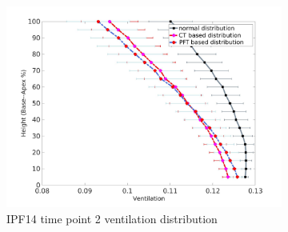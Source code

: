 \begin{figure}[htbp]  
\centering
\begin{subfigure}{.6\linewidth}%
  \includegraphics[width=\linewidth,trim={{.0\wd0} {.0\wd0} {.0\wd0} {.0\wd0}},clip]{Appendix/Image_AppexB/IPF1402/IPF1402_VentilationAgainstLungHeight.png} %
  \caption{IPF14 time point 2 ventilation distribution}
  \label{fig:VQDistribution-a} 
\end{subfigure} 
\begin{subfigure}{.6\linewidth}%

\end{subfigure}
\end{figure}
